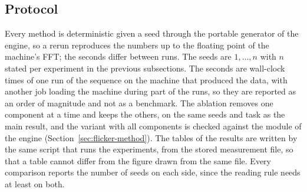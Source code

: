 \subsection{Protocol}

Every method is deterministic given a seed through the portable generator of the engine, so a rerun reproduces the numbers up to the floating point of the machine's FFT; the seconds differ between runs. The seeds are $1,\dots,n$ with $n$ stated per experiment in the previous subsections. The seconds are wall-clock times of one run of the sequence on the machine that produced the data, with another job loading the machine during part of the runs, so they are reported as an order of magnitude and not as a benchmark. The ablation removes one component at a time and keeps the others, on the same seeds and task as the main result, and the variant with all components is checked against the module of the engine (Section~\ref{sec:flicker-method}). The tables of the results are written by the same script that runs the experiments, from the stored measurement file, so that a table cannot differ from the figure drawn from the same file. Every comparison reports the number of seeds on each side, since the reading rule needs at least \winMinSeeds{} on both.
